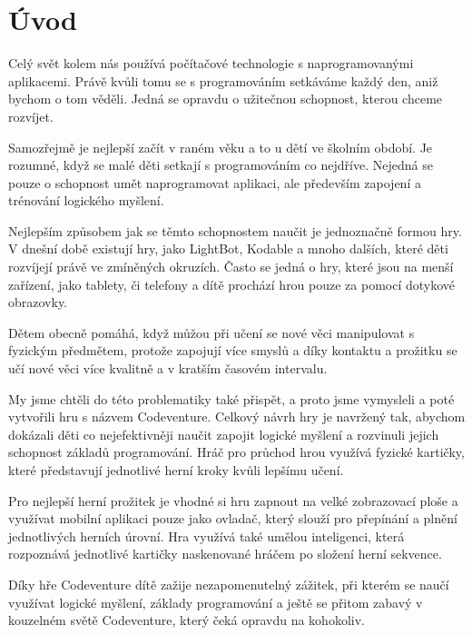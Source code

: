 \chapter{Úvod}

Celý svět kolem nás používá počítačové technologie s naprogramovanými aplikacemi. Právě kvůli tomu se s programováním setkáváme každý den, aniž bychom o tom věděli. Jedná se opravdu o užitečnou schopnost, kterou chceme rozvíjet.\par Samozřejmě je nejlepší začít v raném věku a to u dětí ve školním období. Je rozumné, když se malé děti setkají s programováním co nejdříve. Nejedná se pouze o schopnost umět naprogramovat aplikaci, ale především zapojení a trénování logického myšlení.\par Nejlepším způsobem jak se těmto schopnostem naučit je jednoznačně formou hry. V dnešní době existují hry, jako LightBot, Kodable a mnoho dalších, které děti rozvíjejí právě ve zmíněných okruzích. Často se jedná o hry, které jsou na menší zařízení, jako tablety, či telefony a dítě prochází hrou pouze za pomocí dotykové obrazovky.\par Dětem obecně pomáhá, když můžou při učení se nové věci manipulovat s fyzickým předmětem, protože zapojují více smyslů a díky kontaktu a prožitku se učí nové věci více kvalitně a v kratším časovém intervalu.\par My jsme chtěli do této problematiky také přispět, a proto jsme vymysleli a poté vytvořili hru s názvem Codeventure. Celkový návrh hry je navržený tak, abychom dokázali děti co nejefektivněji naučit zapojit logické myšlení a rozvinuli jejich schopnost základů programování. Hráč pro průchod hrou využívá fyzické kartičky, které představují jednotlivé herní kroky kvůli lepšímu učení.\par Pro nejlepší herní prožitek je vhodné si hru zapnout na velké zobrazovací ploše a využívat mobilní aplikaci pouze jako ovladač, který slouží pro přepínání a plnění jednotlivých herních úrovní. Hra využívá také umělou inteligenci, která rozpoznává jednotlivé kartičky naskenované hráčem po složení herní sekvence.\par Díky hře Codeventure dítě zažije nezapomenutelný zážitek, při kterém se naučí využívat logické myšlení, základy programování a ještě se přitom zabavý v kouzelném světě Codeventure, který čeká opravdu na kohokoliv.
